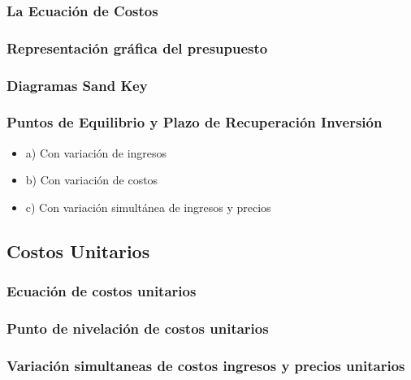 \documentclass[crop=false]{standalone}
\begin{document}
\subsubsection{La Ecuación de Costos}
\subsubsection{Representación gráfica del presupuesto}
\subsubsection{Diagramas Sand Key}

\subsubsection{Puntos de Equilibrio y Plazo de Recuperación Inversión}

\begin{itemize}
    \item a) Con variación de ingresos
    \item b) Con variación de costos
    \item c) Con variación simultánea de ingresos y precios

    
\end{itemize}



\subsection{Costos Unitarios}

\subsubsection{Ecuación de costos unitarios}
\subsubsection{Punto de nivelación de costos unitarios}
\subsubsection{Variación simultaneas de costos ingresos y precios unitarios}




\end{document}

